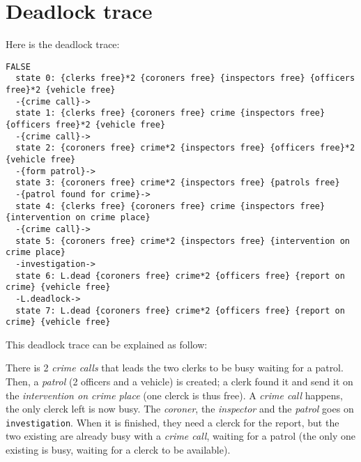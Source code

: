 \section{Deadlock trace}
\label{sec:Deadlock trace}

Here is the deadlock trace: \newline

\begin{lstlisting}
FALSE
  state 0: {clerks free}*2 {coroners free} {inspectors free} {officers free}*2 {vehicle free}
  -{crime call}->
  state 1: {clerks free} {coroners free} crime {inspectors free} {officers free}*2 {vehicle free}
  -{crime call}->
  state 2: {coroners free} crime*2 {inspectors free} {officers free}*2 {vehicle free}
  -{form patrol}->
  state 3: {coroners free} crime*2 {inspectors free} {patrols free}
  -{patrol found for crime}->
  state 4: {clerks free} {coroners free} crime {inspectors free} {intervention on crime place}
  -{crime call}->
  state 5: {coroners free} crime*2 {inspectors free} {intervention on crime place}
  -investigation->
  state 6: L.dead {coroners free} crime*2 {officers free} {report on crime} {vehicle free}
  -L.deadlock->
  state 7: L.dead {coroners free} crime*2 {officers free} {report on crime} {vehicle free}
\end{lstlisting}

This deadlock trace can be explained as follow: \newline

There is 2 \textit{crime calls} that leads the two clerks to be busy waiting
for a patrol. Then, a \textit{patrol} (2 officers and a vehicle) is created; a
clerk found it and send it on the \textit{intervention on crime place} (one clerck is thus
free). A \textit{crime call} happens, the only clerck left is now busy. The
\textit{coroner}, the \textit{inspector} and the \textit{patrol} goes on
\verb#investigation#. When it is finished, they need a clerck for the report, but the
two existing are already busy with a \textit{crime call}, waiting for a patrol
(the only one existing is busy, waiting for a clerck to be available). \newline
